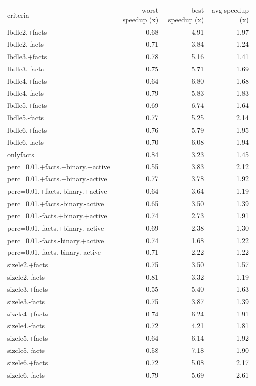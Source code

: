 \hspace{-5em}
\begin{minipage}{\textwidth}
	\small
	\begin{tabular}{lrrr}
		\toprule
		criteria	&	worst speedup (x)	&	best speedup (x)	&	avg speedup (x) \\
		\cmidrule(r){1-4}
		lbdle2.+facts	&	0.68	&	4.91	&	1.97 \\
		lbdle2.-facts	&	0.71	&	3.84	&	1.24 \\
		lbdle3.+facts	&	0.78	&	5.16	&	1.41 \\
		lbdle3.-facts	&	0.75	&	5.71	&	1.69 \\
		lbdle4.+facts	&	0.64	&	6.80	&	1.68 \\
		lbdle4.-facts	&	0.79	&	5.83	&	1.83 \\
		lbdle5.+facts	&	0.69	&	6.74	&	1.64 \\
		lbdle5.-facts	&	0.77	&	5.25	&	2.14 \\
		lbdle6.+facts	&	0.76	&	5.79	&	1.95 \\
		lbdle6.-facts	&	0.70	&	6.08	&	1.94 \\
		\cmidrule(r){1-4}
		onlyfacts	&	\cellcolor{green}0.84	&	3.23	&	1.45 \\
		\cmidrule(r){1-4}
		perc=0.01.+facts.+binary.+active	&	\cellcolor{red}0.55	&	3.83	&	2.12 \\
		perc=0.01.+facts.+binary.-active	&	0.77	&	3.78	&	1.92 \\
		perc=0.01.+facts.-binary.+active	&	0.64	&	3.64	&	\cellcolor{red}1.19 \\
		perc=0.01.+facts.-binary.-active	&	0.65	&	3.50	&	1.39 \\
		perc=0.01.-facts.+binary.+active	&	0.74	&	2.73	&	1.91 \\
		perc=0.01.-facts.+binary.-active	&	0.69	&	2.38	&	1.30 \\
		perc=0.01.-facts.-binary.+active	&	0.74	&	\cellcolor{red}1.68	&	1.22 \\
		perc=0.01.-facts.-binary.-active	&	0.71	&	2.22	&	1.22 \\
		\cmidrule(r){1-4}
		sizele2.+facts	&	0.75	&	3.50	&	1.57 \\
		sizele2.-facts	&	0.81	&	3.32	&	\cellcolor{red}1.19 \\
		sizele3.+facts	&	\cellcolor{red}0.55	&	5.40	&	1.63 \\
		sizele3.-facts	&	0.75	&	3.87	&	1.39 \\
		sizele4.+facts	&	0.74	&	6.24	&	1.91 \\
		sizele4.-facts	&	0.72	&	4.21	&	1.81 \\
		sizele5.+facts	&	0.64	&	6.14	&	1.92 \\
		sizele5.-facts	&	0.58	&	\cellcolor{green}7.18	&	1.90 \\
		sizele6.+facts	&	0.72	&	5.08	&	2.17 \\
		sizele6.-facts	&	0.79	&	5.69	&	\cellcolor{green}2.61 \\
		\bottomrule
	\end{tabular}
\end{minipage}



